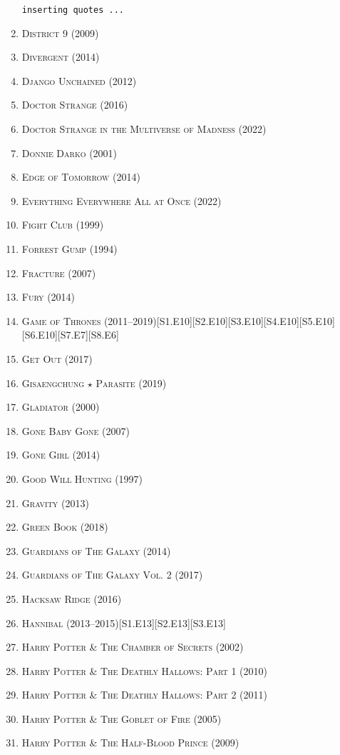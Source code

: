 \documentclass[oneside]{book}
\numberwithin{equation}{section}
\begin{document}
\begin{enumerate}
	\texttt{inserting quotes ...}
	\item \textsc{District 9} (2009)
	\item \textsc{Divergent} (2014)
	\item \textsc{Django Unchained} (2012)
	\item \textsc{Doctor Strange} (2016)
	\item \textsc{Doctor Strange in the Multiverse of Madness} (2022)
	\item \textsc{Donnie Darko} (2001)
	\item \textsc{Edge of Tomorrow} (2014)
	\item \textsc{Everything Everywhere All at Once} (2022)
	\item \textsc{Fight Club} (1999)
	\item \textsc{Forrest Gump} (1994)
	\item \textsc{Fracture} (2007)
	\item \textsc{Fury} (2014)
	\item \textsc{Game of Thrones} (2011--2019)\hfill[S1.E10][S2.E10][S3.E10][S4.E10][S5.E10][S6.E10][S7.E7][S8.E6]
	\item \textsc{Get Out} (2017)
	\item \textsc{Gisaengchung $\star$ Parasite} (2019)
	\item \textsc{Gladiator} (2000)
	\item \textsc{Gone Baby Gone} (2007)
	\item \textsc{Gone Girl} (2014)
	\item \textsc{Good Will Hunting} (1997)
	\item \textsc{Gravity} (2013)
	\item \textsc{Green Book} (2018)
	\item \textsc{Guardians of The Galaxy} (2014)
	\item \textsc{Guardians of The Galaxy Vol. 2} (2017)
	\item \textsc{Hacksaw Ridge} (2016)
	\item \textsc{Hannibal} (2013--2015)\hfill[S1.E13][S2.E13][S3.E13]
	\item \textsc{Harry Potter \& The Chamber of Secrets} (2002)
	\item \textsc{Harry Potter \& The Deathly Hallows: Part 1} (2010)
	\item \textsc{Harry Potter \& The Deathly Hallows: Part 2} (2011)
	\item \textsc{Harry Potter \& The Goblet of Fire} (2005)
	\item \textsc{Harry Potter \& The Half-Blood Prince} (2009)

\end{enumerate}
\end{document}
